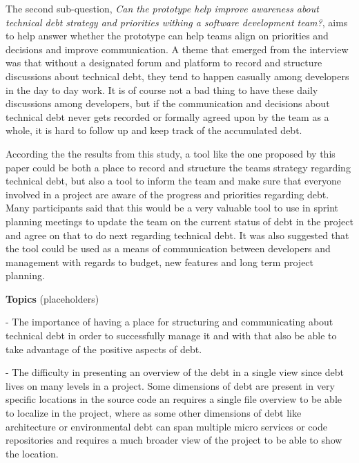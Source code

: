 The second sub-question, \textit{Can the prototype help improve awareness about technical debt strategy and priorities withing a software development team?}, aims to help answer whether the prototype can help teams align on priorities and decisions and improve communication.
A theme that emerged from the interview was that without a designated forum and platform to record and structure discussions about technical debt, they tend to happen casually among developers in the day to day work.
It is of course not a bad thing to have these daily discussions among developers, but if the communication and decisions about technical debt never gets recorded or formally agreed upon by the team as a whole, it is hard to follow up and keep track of the accumulated debt.

According the the results from this study, a tool like the one proposed by this paper could be both a place to record and structure the teams strategy regarding technical debt, but also a tool to inform the team and make sure that everyone involved in a project are aware of the progress and priorities regarding debt.
Many participants said that this would be a very valuable tool to use in sprint planning meetings to update the team on the current status of debt in the project and agree on that to do next regarding technical debt.
It was also suggested that the tool could be used as a means of communication between developers and management with regards to budget, new features and long term project planning.

\textbf{Topics} (placeholders)

- The importance of having a place for structuring and communicating about technical debt in order to successfully manage it and with that also be able to take advantage of the positive aspects of debt.

- The difficulty in presenting an overview of the debt in a single view since debt lives on many levels in a project. Some dimensions of debt are present in very specific locations in the source code an requires a single file overview to be able to localize in the project, where as some other dimensions of debt like architecture or environmental debt can span multiple micro services or code repositories and requires a much broader view of the project to be able to show the location.



